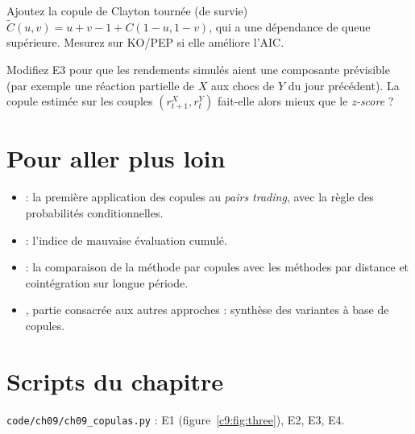 \begin{exercise}[à coder]
Ajoutez la copule de Clayton \og tournée\fg{} (de survie) $\tilde C(u,v) = u + v - 1 + C(1-u,1-v)$, qui a une dépendance de queue supérieure. Mesurez sur KO/PEP si elle améliore l'AIC.
\end{exercise}

\begin{exercise}[à coder]
Modifiez E3 pour que les rendements simulés aient une composante prévisible (par exemple une réaction partielle de $X$ aux chocs de $Y$ du jour précédent). La copule estimée sur les couples $(r^X_{t+1}, r^Y_t)$ fait-elle alors mieux que le \emph{z-score} ?
\end{exercise}

\section{Pour aller plus loin}

\begin{toread}
\begin{itemize}[leftmargin=1.2em]
\item \citet{liewwu2013} : la première application des copules au \emph{pairs trading}, avec la règle des probabilités conditionnelles.
\item \citet{xie2016} : l'indice de mauvaise évaluation cumulé.
\item \citet{rad2016} : la comparaison de la méthode par copules avec les méthodes par distance et cointégration sur longue période.
\item \citet{krauss2017survey}, partie consacrée aux \og autres approches\fg{} : synthèse des variantes à base de copules.
\end{itemize}
\end{toread}

\section{Scripts du chapitre}
\noindent\texttt{code/ch09/ch09\_copulas.py} : E1 (figure~\ref{c9:fig:three}), E2, E3, E4.
